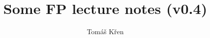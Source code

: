 \documentclass[a4paper,oneside]{memoir}
\title{Some FP lecture notes (v0.4)}
\author{Tomáš Křen}
\begin{document}
\theoremstyle{plain} 
\newtheorem{theorem}{Theorem} 
\newtheorem{proposition}{Proposition} 
\newtheorem{lemma}{Lemma} 
\newtheorem{preLemma}{Pre-Lemma} 
\newtheorem*{corollary}{Corollary}

\theoremstyle{definition} 
\newtheorem*{definition}{Definition} 
\newtheorem*{preDefinition}{Pre-Definition} 
\newtheorem{conjecture}{Conjecture}
\newtheorem*{example}{Example} 

\theoremstyle{remark} 
\newtheorem*{remark}{Remark} 
\newtheorem*{note}{Note} 
\newtheorem{case}{Case}

\frontmatter
\mainmatter
\maketitle


\tableofcontents*

\newcommand{\red}[1]{{\color{red} #1}}



\newcommand{\sigmaPr}{\sigma^\prime}
\newcommand{\tauPr}{\tau^\prime}
\newcommand{\xPr}{x^\prime}
\newcommand{\nPr}{n^\prime}
\newcommand{\nPrr}{n^{\prime\prime}}
\newcommand{\nPrrr}{n^{\prime\prime\prime}}
\newcommand{\tausPr}{\tau_s^\prime}
\newcommand{\s}{\sigma}
\newcommand{\Th}{\theta}
\newcommand{\sPr}{\sigmaPr}
\newcommand{\thPr}{\theta^\prime}



\newcommand{\then}{\Rightarrow}
\newcommand{\E}[2]{(\exists #1)\ #2}
\newcommand{\A}[2]{(\forall #1)\ #2}
\newcommand{\Ain}[3]{(\forall #1 \in #2)\ #3}


\newcommand{\op}{\operatorname}

\newcommand{\ar}{\rightarrow}
\newcommand{\ap}[2]{(#1\,#2)}
\newcommand{\defi}{\coloneqq}
\newcommand{\defe}{\mathrel{\vcentcolon\equiv}}

\newcommand{\unaRule}[2]{\dfrac{#1}{#2}}
\newcommand{\binRule}[3]{\dfrac{#1 ~ ~ ~ ~ ~ ~ ~ #2}{#3}}
\newcommand{\triRule}[4]{\dfrac{#1 ~ ~ ~ ~ ~ ~ ~ #2 ~ ~ ~ ~ ~ ~ ~ #3}{#4}}
\newcommand{\isSub}[1]{#1\ \mathit{substitution}}
\newcommand{\MGU}[2]{\op{MGU}(#1,#2)}
\newcommand{\mgu}[1]{\op{MGU}(#1)}

\newcommand{\AX}{\textit{AX}\xspace}
\newcommand{\subAx}{\textit{SUB-AX}\xspace}
\newcommand{\mguMp}{\textit{MGU-MP}\xspace}
\newcommand{\abs}[1]{\lvert #1 \rvert}

\newcommand{\Pseudokod}[4]{
	\begin{figure}[!t]
	\removelatexerror
	\begin{algorithm}[H]
		\caption{\label{#4}#1}
		\DontPrintSemicolon
		\SetKwProg{Fn}{function}{}{}
		\Fn{#2}{#3}
	\end{algorithm}
	\end{figure}
}
\end{document}
